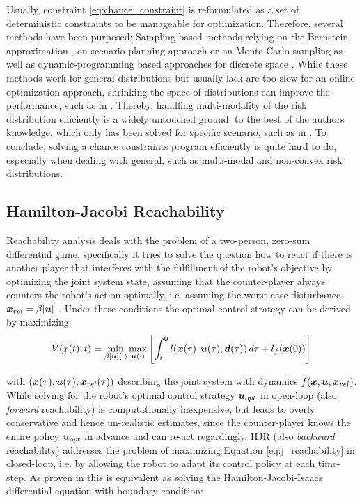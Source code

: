 Usually, constraint \ref{eq:chance_constraint} is reformulated as a set of deterministic constraints to be manageable for optimization. Therefore, several methods have been purposed: Sampling-based methods relying on the Bernstein approximation \cite{Calafiore2005}, on scenario planning approach \cite{Bemporad1999} or on Monte Carlo sampling \cite{Hong2011}\cite{Janson2015} as well as dynamic-programming based approaches for discrete space \cite{Chow2013}\cite{Ono2015} \cite{Chow2015a}. While these methods work for general distributions but usually lack are too slow for an online optimization approach, shrinking the space of distributions can improve the performance, such as in \cite{Chen2018}\cite{Calafiore2006}\cite{Carvalho2014}\cite{Blackmore2009}\cite{Blackmore2011}. Thereby, handling multi-modality of the risk distribution efficiently is a widely untouched ground, to the best of the authors knowledge, which only has been solved for specific scenario, such as in \cite{Hu2018}. To conclude, solving a chance constraints program efficiently is quite hard to do, especially when dealing with general, such as multi-modal and  non-convex risk distributions.

\subsection{Hamilton-Jacobi Reachability} 
Reachability analysis deals with the problem of a two-person, zero-sum differential game, specifically it tries to solve the question how to react if there is another player that interferes with the fulfillment of the robot's objective by optimizing the joint system state, assuming that the counter-player always counters the robot's action optimally, i.e. assuming the worst case disturbance $\boldsymbol{x}_{rel} = \beta[\boldsymbol{u}]$ \cite{Pavone2020}. Under these conditions the optimal control strategy can be derived by maximizing: \\

\begin{equation}
V(x(t), t) = \min_{\beta[\boldsymbol{u}](\cdot)} \max_{\boldsymbol{u}(\cdot)} \left[ \int_t^0 l(\boldsymbol{x}(\tau), \boldsymbol{u}(\tau), \boldsymbol{d}(\tau)) \, d\tau + l_f(\boldsymbol{x}(0)) \right]
\label{eq:j_reachability}
\end{equation}

with $(\boldsymbol{x}(\tau), \boldsymbol{u}(\tau), \boldsymbol{x}_{rel}(\tau))$ describing the joint system with dynamics $f(\boldsymbol{x}, \boldsymbol{u}, \boldsymbol{x}_{rel})$. While solving for the robot's optimal control strategy $\boldsymbol{u}_{opt}$ in open-loop (also \textit{forward} reachability) is computationally inexpensive, but leads to overly conservative and hence un-realistic estimates, since the counter-player knows the entire policy $\boldsymbol{u}_{opt}$ in advance and can re-act regardingly, \ac{HJR} (also \textit{backward} reachability) addresses the problem of maximizing Equation \ref{eq:j_reachability} in closed-loop, i.e. by allowing the robot to adapt its control policy at each time-step. As proven in \cite{Pavone2020} this is equivalent as solving the Hamilton-Jacobi-Isaacs differential equation with boundary condition: \\

